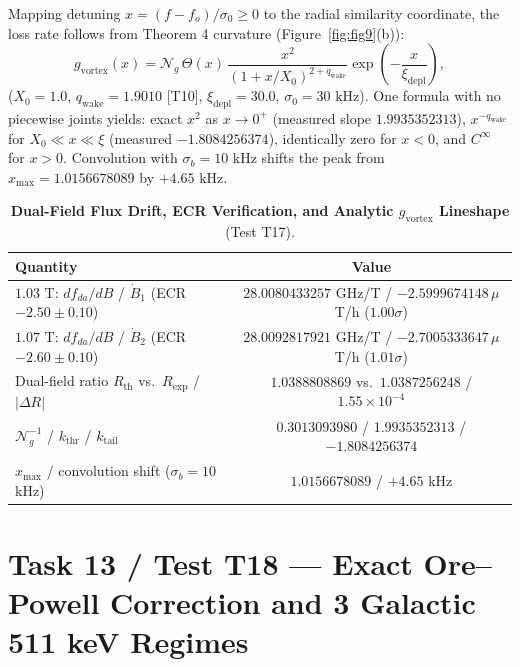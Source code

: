 \documentclass[12pt,a4paper]{article}
\begin{document}
Mapping detuning $x=(f-f_o)/\sigma_0\ge0$ to the radial similarity coordinate, the loss rate follows from Theorem 4 curvature (Figure~\ref{fig:fig9}(b)):
\begin{equation}
g_{\mathrm{vortex}}(x) = \mathcal{N}_g\,\Theta(x)\,\frac{x^2}{(1+x/X_0)^{2+q_{\mathrm{wake}}}}\exp\left(-\frac{x}{\xi_{\mathrm{depl}}}\right),
\label{eq:gvortex}
\end{equation}
($X_0=1.0$, $q_{\mathrm{wake}}=1.9010$ [T10], $\xi_{\mathrm{depl}}=30.0$, $\sigma_0=30\text{ kHz}$). One formula with no piecewise joints yields: exact $x^2$ as $x\to0^+$ (measured slope $1.9935352313$), $x^{-q_{\mathrm{wake}}}$ for $X_0\ll x\ll\xi$ (measured $-1.8084256374$), identically zero for $x<0$, and $C^\infty$ for $x>0$. Convolution with $\sigma_b=10\text{ kHz}$ shifts the peak from $x_{\max}=1.0156678089$ by $+4.65\text{ kHz}$.

\begin{table}[!htbp]
\centering
\footnotesize
\setlength{\tabcolsep}{3pt}
\caption{\textbf{Dual-Field Flux Drift, ECR Verification, and Analytic $g_{\mathrm{vortex}}$ Lineshape} (Test T17).}
\label{tab:t17}
\vspace{0.1cm}
\begin{tabular}{@{}l|c@{}}
\hline
Quantity & Value \\
\hline
$1.03\text{ T}$: $df_{da}/dB$ / $\dot{B}_1$ (ECR $-2.50\pm0.10$) & $28.0080433257$ GHz/T / $-2.5999674148\,\mu$T/h ($1.00\sigma$) \\
$1.07\text{ T}$: $df_{da}/dB$ / $\dot{B}_2$ (ECR $-2.60\pm0.10$) & $28.0092817921$ GHz/T / $-2.7005333647\,\mu$T/h ($1.01\sigma$) \\
Dual-field ratio $R_{\mathrm{th}}$ vs.\ $R_{\mathrm{exp}}$ / $\vert{}\Delta R\vert{}$ & $1.0388808869$ vs.\ $1.0387256248$ / $1.55\times10^{-4}$ \\
$\mathcal{N}_g^{-1}$ / $k_{\mathrm{thr}}$ / $k_{\mathrm{tail}}$ & $0.3013093980$ / $1.9935352313$ / $-1.8084256374$ \\
$x_{\max}$ / convolution shift ($\sigma_b=10$ kHz) & $1.0156678089$ / $+4.65$ kHz \\
\hline
\end{tabular}
\end{table}

\section{Task 13 / Test T18 --- Exact Ore--Powell Correction and 3 Galactic 511 keV Regimes}
\end{document}
